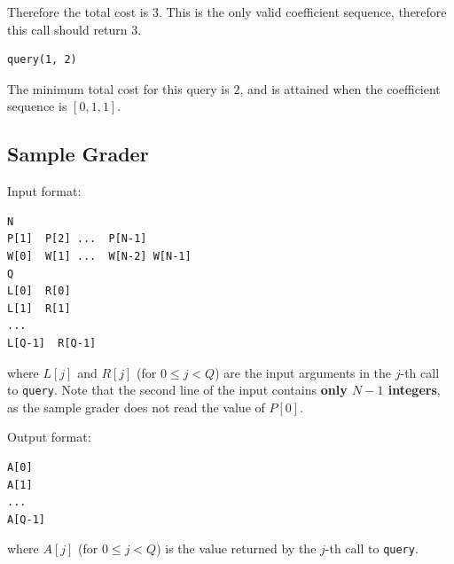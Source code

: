Therefore the total cost is \(3\). This is the only valid coefficient
sequence, therefore this call should return \(3\).

\begin{verbatim}
query(1, 2)
\end{verbatim}

The minimum total cost for this query is \(2\), and is attained when the
coefficient sequence is \([0, 1, 1]\).

\hypertarget{sample-grader}{%
\subsection{Sample Grader}\label{sample-grader}}

Input format:

\begin{verbatim}
N
P[1]  P[2] ...  P[N-1]
W[0]  W[1] ...  W[N-2] W[N-1]
Q
L[0]  R[0]
L[1]  R[1]
...
L[Q-1]  R[Q-1]
\end{verbatim}

where \(L[j]\) and \(R[j]\) (for \(0 \leq j < Q\)) are the input
arguments in the \(j\)-th call to \texttt{query}. Note that the second
line of the input contains \textbf{only \(N-1\) integers}, as the sample
grader does not read the value of \(P[0]\).

Output format:

\begin{verbatim}
A[0]
A[1]
...
A[Q-1]
\end{verbatim}

where \(A[j]\) (for \(0 \leq j < Q\)) is the value returned by the
\(j\)-th call to \texttt{query}.
